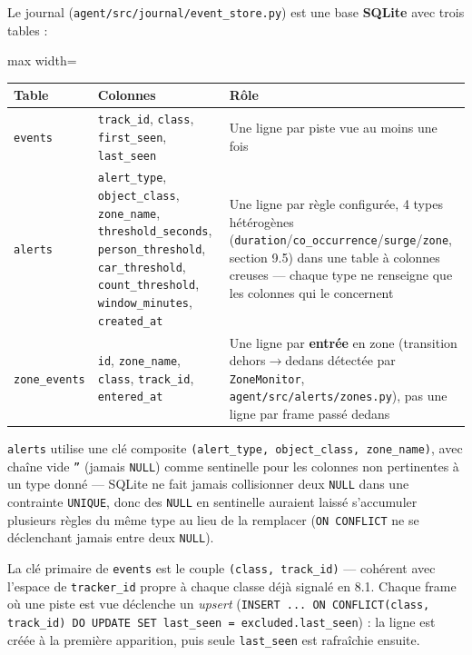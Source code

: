 \documentclass[11pt,a4paper]{article}
\begin{document}
    Le journal (\texttt{agent/src/journal/event\_store.py}) est une base
    \textbf{SQLite} avec trois tables :
    
    \begin{table}[!htbp]
    \centering
    \footnotesize
    \begin{adjustbox}{max width=\linewidth}
    \begin{tabular}{@{}lp{7.5cm}p{6.5cm}@{}}
    \toprule
    \textbf{Table} & \textbf{Colonnes} & \textbf{Rôle} \\
    \midrule
    \texttt{events} & \texttt{track\_id}, \texttt{class}, \texttt{first\_seen}, \texttt{last\_seen} & Une ligne par piste vue au moins une fois \\
    \texttt{alerts} & \texttt{alert\_type}, \texttt{object\_class}, \texttt{zone\_name}, \texttt{threshold\_seconds}, \texttt{person\_threshold}, \texttt{car\_threshold}, \texttt{count\_threshold}, \texttt{window\_minutes}, \texttt{created\_at} & Une ligne par règle configurée, 4 types hétérogènes (\texttt{duration}/\texttt{co\_occurrence}/\texttt{surge}/\texttt{zone}, section 9.5) dans une table à colonnes creuses --- chaque type ne renseigne que les colonnes qui le concernent \\
    \texttt{zone\_events} & \texttt{id}, \texttt{zone\_name}, \texttt{class}, \texttt{track\_id}, \texttt{entered\_at} & Une ligne par \textbf{entrée} en zone (transition dehors$\to$dedans détectée par \texttt{ZoneMonitor}, \texttt{agent/src/alerts/zones.py}), pas une ligne par frame passé dedans \\
    \bottomrule
    \end{tabular}
    \end{adjustbox}
    \end{table}
    
    \texttt{alerts} utilise une clé composite \texttt{(alert\_type,
    object\_class, zone\_name)}, avec chaîne vide \texttt{''} (jamais
    \texttt{NULL}) comme sentinelle pour les colonnes non pertinentes à un
    type donné --- SQLite ne fait jamais collisionner deux \texttt{NULL}
    dans une contrainte \texttt{UNIQUE}, donc des \texttt{NULL} en
    sentinelle auraient laissé s'accumuler plusieurs règles du même type au
    lieu de la remplacer (\texttt{ON CONFLICT} ne se déclenchant jamais
    entre deux \texttt{NULL}).
    
    La clé primaire de \texttt{events} est le couple \texttt{(class,
    track\_id)} --- cohérent avec l'espace de \texttt{tracker\_id} propre à
    chaque classe déjà signalé en 8.1. Chaque frame où une piste est vue
    déclenche un \emph{upsert} (\texttt{INSERT ... ON CONFLICT(class,
    track\_id) DO UPDATE SET last\_seen = excluded.last\_seen}) : la ligne
    est créée à la première apparition, puis seule \texttt{last\_seen} est
    rafraîchie ensuite.
    
\end{document}
